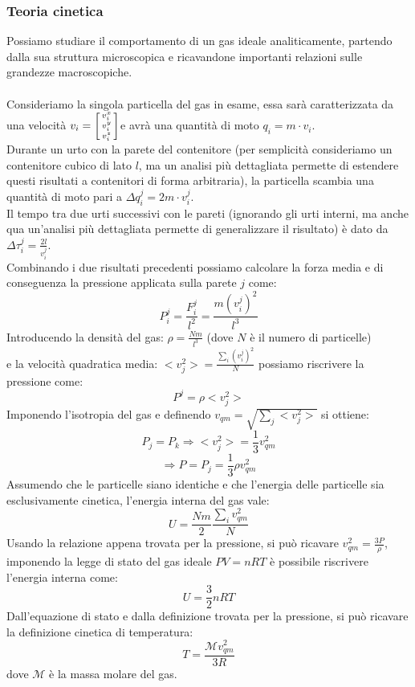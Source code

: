\documentclass{article}
\begin{document}
\subsubsection{Teoria cinetica}
Possiamo studiare il comportamento di un gas ideale analiticamente, partendo dalla sua struttura microscopica e ricavandone importanti relazioni sulle grandezze macroscopiche.\\\\
Consideriamo la singola particella del gas in esame, essa sarà caratterizzata da una velocità $v_i=\begin{bsmallmatrix} v_i^x\\v_i^y\\v_i^z  \end{bsmallmatrix}$e avrà una quantità di moto $q_i=m\cdot v_i$.\\
Durante un urto con la parete del contenitore (per semplicità consideriamo un contenitore cubico di lato $l$, ma un analisi più dettagliata permette di estendere questi risultati a contenitori di forma arbitraria), la particella scambia una quantità di moto pari a $\Delta q_i^j=2m\cdot v_i^j$.\\
Il tempo tra due urti successivi con le pareti (ignorando gli urti interni, ma anche qua un'analisi più dettagliata permette di generalizzare il risultato) è dato da $\Delta\tau_i^j=\frac{2l}{v_i^j}$.\\
Combinando i due risultati precedenti possiamo calcolare la forza media e di conseguenza la pressione applicata sulla parete $j$ come:
$$ P_i^j=\frac{F_i^j}{l^2}=\frac{m(v_i^j)^2}{l^3} $$
Introducendo la densità del gas: $ \rho=\frac{Nm}{l^3} $ (dove $N$ è il numero di particelle)\\
e la velocità quadratica media: $<v_j^2>=\frac{\sum_i(v_i^j)^2}{N}$
possiamo riscrivere la pressione come:
$$ P^j=\rho<v_j^2>$$
Imponendo l'isotropia del gas e definendo $v_{qm}=\sqrt{\sum_j<v_j^2>}$ si ottiene:
$$ P_j=P_k\Rightarrow<v_j^2>=\frac{1}{3}v^2_{qm} $$
$$ \Rightarrow P=P_j=\frac{1}{3}\rho v^2_{qm} $$
Assumendo che le particelle siano identiche e che l'energia delle particelle sia esclusivamente cinetica, l'energia interna del gas vale:
$$ U = \frac{Nm}{2}\frac{\sum_i v^2_{qm}}{N} $$
Usando la relazione appena trovata per la pressione, si può ricavare $v^2_{qm}=\frac{3P}{\rho}$, imponendo la legge di stato del gas ideale $PV=nRT$ è possibile riscrivere l'energia interna come:
$$ U=\frac{3}{2}nRT $$
Dall'equazione di stato e dalla definizione trovata per la pressione, si può ricavare la definizione cinetica di temperatura:
$$ T = \frac{\mathcal{M} v^2_{qm}}{3R} $$
dove $\mathcal{M}$ è la massa molare del gas.
\end{document}

